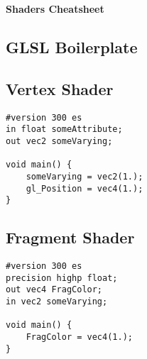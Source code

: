 \documentclass{article}
\begin{document}
    \begin{landscape}
        \begin{center}
            \begin{LARGE}
                \textbf{Shaders Cheatsheet}
            \end{LARGE}
        \end{center}
        \begin{multicols}{3}

            \section{GLSL Boilerplate}
            \subsection{Vertex Shader}
            \begin{verbatim}
#version 300 es
in float someAttribute;
out vec2 someVarying;

void main() {
    someVarying = vec2(1.);
    gl_Position = vec4(1.);
}
            \end{verbatim}

            \subsection{Fragment Shader}
            \begin{verbatim}
#version 300 es
precision highp float;
out vec4 FragColor;
in vec2 someVarying;

void main() {
    FragColor = vec4(1.);
}
            \end{verbatim}


\end{multicols}
\end{landscape}
\end{document}
